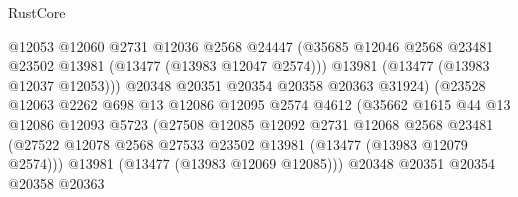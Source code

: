 \begin{lexlean}{RustCore}
\begin{coremodule}
                                    @12053
                                    @12060
                                    @2731
                                    @12036
                                    @2568
                                    @24447
                                    (@35685
                                      @12046
                                      @2568
                                      @23481
                                      @23502
                                      @13981
                                      (@13477 (@13983 @12047 @2574)))
                                    @13981
                                    (@13477 (@13983 @12037 @12053)))
                                  @20348
                                  @20351
                                  @20354
                                  @20358
                                  @20363
                                  @31924)
                                (@23528
                                  @12063
                                  @2262
                                  @698
                                  @13
                                  @12086
                                  @12095
                                  @2574
                                  @4612
                                  (@35662
                                    @1615
                                    @44
                                    @13
                                    @12086
                                    @12093
                                    @5723
                                    (@27508
                                      @12085
                                      @12092
                                      @2731
                                      @12068
                                      @2568
                                      @23481
                                      (@27522
                                        @12078
                                        @2568
                                        @27533
                                        @23502
                                        @13981
                                        (@13477 (@13983 @12079 @2574)))
                                      @13981
                                      (@13477 (@13983 @12069 @12085)))
                                    @20348
                                    @20351
                                    @20354
                                    @20358
                                    @20363

\end{coremodule}
\end{lexlean}
